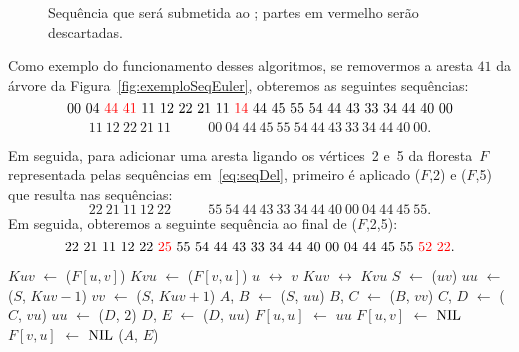 \begin{figure}[htb]
\centering

\caption{Sequência que será submetida ao \dymForestDelEdge{}; partes em vermelho serão descartadas.}
\label{fig:algorit-cut-seqxy}
\end{figure}

Como exemplo do funcionamento desses algoritmos, se removermos a aresta $41$ da árvore da Figura~\ref{fig:exemploSeqEuler}, obteremos as seguintes sequências:
\begin{equation}
00~04~{\color{red} 44~41}~11~12~22~21~11~{\color{red} 14}~44~45~55~54~44~43~33~34~44~40~00\nonumber
\end{equation}
\begin{equation}
11~12~22~21~11~~~~~~~~~~~~00~04~44~45~55~54~44~43~33~34~44~40~00.\label{eq:seqDel}
\end{equation}

Em seguida, para adicionar uma aresta ligando os vértices~2 e~5 da floresta~$F$ representada pelas sequências em~\eqref{eq:seqDel}, primeiro é aplicado \ETmovetofront($F$,2) e \ETmovetofront($F$,5) que resulta nas sequências:
\begin{equation}
22~21~11~12~22   ~~~~~~~~~~~~55~54~44~43~33~34~44~40~00~04~44~45~55.\nonumber
\end{equation}%
Em seguida, obteremos a seguinte sequência ao final de \ETTAddEdge($F$,2,5):
\begin{equation}
22~21~11~12~22~{\color{red} 25}~55~54~44~43~33~34~44~40~00~04~44~45~55~{\color{red} 52~22}.\nonumber
\end{equation}%

\begin{algorithm}[htb]
\caption{\dymForestDelEdge($F$, $u$, $v$)}
\label{Algo:dymForestDelEdge}
\begin{algorithmic}[1]
\State $Kuv$ $\gets$ \treapOrder($F[u,v]$)
\State $Kvu$ $\gets$ \treapOrder($F[v,u]$) 
	\State $u$ $\leftrightarrow$ $v$
	\State $Kuv$ $\leftrightarrow$ $Kvu$
\EndIf
\State $S$ $\gets$ \treapGetRoot($uv$)
\State $uu$ $\gets$ \treapSearch($S$, $Kuv-1$)
\State $vv$ $\gets$ \treapSearch($S$, $Kuv+1$)
\State $A$, $B$ $\gets$ \treapSplit($S$, $uu$)
\State $B$, $C$ $\gets$ \treapSplit($B$, $vv$)
\State $C$, $D$ $\gets$ \treapSplit($C$, $vu$)
\State $uu$ $\gets$ \treapSearch($D$, $2$)
\State $D$, $E$ $\gets$ \treapSplit($D$, $uu$)
\State $F[u,u]$ $\gets$ $uu$
\State $F[u,v]$ $\gets$ $\text{NIL}{}$
\State $F[v,u]$ $\gets$ $\text{NIL}{}$
\State \treapJoin($A$, $E$)
\end{algorithmic}
\end{algorithm}





